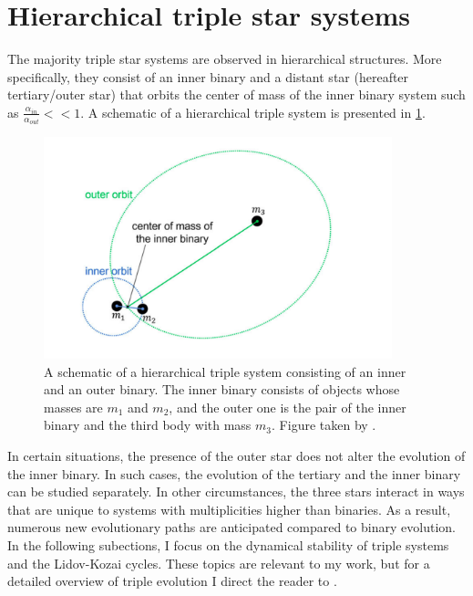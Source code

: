 \section{Hierarchical triple star systems}\label{sec:triples_evolution}

The majority triple star systems are observed in hierarchical structures. More specifically, they consist of an inner binary and a distant star (hereafter tertiary/outer star) that orbits the center of mass of the inner binary system such as $\frac{\alpha_{in}}{\alpha_{out}} << 1$. A schematic of a hierarchical triple system is presented in \cref{fig:triple_schem}.
\begin{figure}[H]
    \centering
    \includegraphics[width=0.9\textwidth]{Thesis/figures/triple_schem.pdf}
    \caption{A schematic of a hierarchical triple system consisting of an inner and an outer binary. The inner binary consists of objects whose masses are $m_1$ and $m_2$, and the outer one is the pair of the inner binary and the third body with mass $m_3$. Figure taken by \cite{gupta2020gravitational}.}
    \label{fig:triple_schem}
\end{figure}

In certain situations, the presence of the outer star does not alter the evolution of the inner binary. In such cases, the evolution of the tertiary  and the inner binary can be studied separately. In other circumstances, the three stars interact in ways that are unique to systems with multiplicities higher than binaries. As a result, numerous new evolutionary paths are anticipated compared to binary evolution. In the following subections, I focus on the dynamical stability of triple systems and the Lidov-Kozai cycles. These topics are relevant to my work, but for a detailed overview of triple evolution I direct the reader to \cite{michaely2014secular,toonen2016evolution}.

